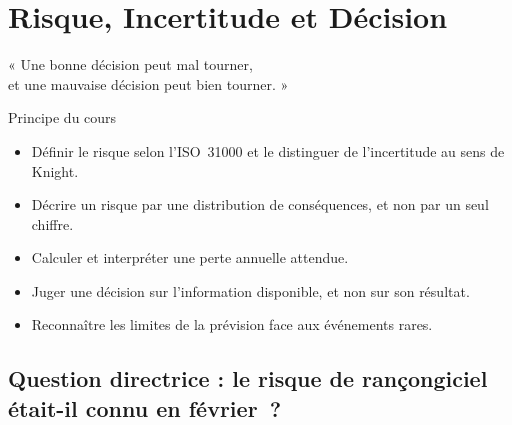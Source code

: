 
\chapter{Risque, Incertitude et Décision}
\label{chap:risque}

\epigraph{%
    « Une bonne décision peut mal tourner,\\
    et une mauvaise décision peut bien tourner. »%
}{Principe du cours}


\begin{boxobjectifs}
\begin{itemize}
    \item Définir le risque selon l'ISO~31000 et le distinguer de
          l'incertitude au sens de Knight.
    \item Décrire un risque par une distribution de conséquences, et non par
          un seul chiffre.
    \item Calculer et interpréter une perte annuelle attendue.
    \item Juger une décision sur l'information disponible, et non sur son
          résultat.
    \item Reconnaître les limites de la prévision face aux événements rares.
\end{itemize}
\end{boxobjectifs}

\bigskip

\section*{Question directrice : le risque de rançongiciel était-il connu en février~?}

